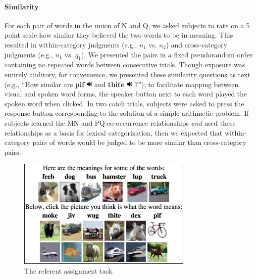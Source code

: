 \documentclass[man,floatsintext]{apa6}
\begin{document}
\paragraph{Similarity}
For each pair of words in the union of N and Q, we asked subjects to
rate on a 5 point scale how similar they believed the two words to be
in meaning. This resulted in within-category judgments (e.g., $n_1$
vs. $n_2$) and cross-category judgments (e.g., $n_1$ vs. $q_1$). We
presented the pairs in a fixed pseudorandom order containing no
repeated words between consecutive trials. Though exposure was
entirely auditory, for convenience, we presented these similarity
questions as text (e.g., ``How similar are
\textbf{pif} \includegraphics[width=0.3cm]{play.png} and
\textbf{thite} \includegraphics[width=0.3cm]{play.png} ?''); to
facilitate mapping between visual and spoken word forms, the speaker
button next to each word played the spoken word when clicked. In two
catch trials, subjects were asked to press the response button
corresponding to the solution of a simple arithmetic problem. If
subjects learned the MN and PQ co-occurrence relationships \emph{and}
used these relationships as a basis for lexical categorization, then
we expected that within-category pairs of words would be judged to be
more similar than cross-category pairs.

\begin{figure}[t]
  \begin{center}
    \includegraphics[width=8.5cm]{meaning-html-cropped.png}
    \caption{The referent assignment task.}
    \label{meaning-task}
  \end{center}
\end{figure}
\end{document}
